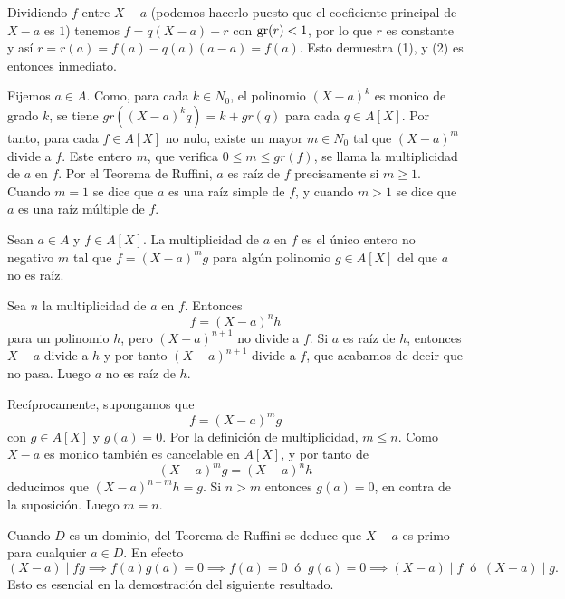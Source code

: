 \begin{proofbox}
Dividiendo $f$ entre $X-a$ (podemos hacerlo puesto que el coeficiente principal de $X-a$ es $1$) tenemos $f=q(X-a)+r$ con $\operatorname{gr}(r)<1$, por lo que $r$ es constante y así $r=r(a)=f(a)-q(a)(a-a)=f(a)$. Esto demuestra (1), y (2) es entonces inmediato.
\end{proofbox}

Fijemos $a \in A$. Como, para cada $k \in N_0$, el polinomio $(X - a)^k$ es monico de grado $k$, se tiene $gr((X - a)^k q) = k + gr(q)$ para cada $q \in A[X]$. Por tanto, para cada $f \in A[X]$ no nulo, existe un mayor $m \in N_0$ tal que $(X - a)^m$ divide a $f$. Este entero $m$, que verifica $0 \leq m \leq gr(f)$, se llama la multiplicidad de $a$ en $f$. Por el Teorema de Ruffini, $a$ es raíz de $f$ precisamente si $m \geq 1$. Cuando $m = 1$ se dice que $a$ es una raíz simple de $f$, y cuando $m > 1$ se dice que $a$ es una raíz múltiple de $f$.

\begin{lemma}{}{}
Sean $a \in A$ y $f \in A[X]$. La multiplicidad de $a$ en $f$ es el único entero no negativo $m$ tal que $f = (X - a)^m g$ para algún polinomio $g \in A[X]$ del que $a$ no es raíz.
\end{lemma}

\begin{proofbox}
Sea $n$ la multiplicidad de $a$ en $f$. Entonces
\[
f = (X - a)^n h
\]
para un polinomio $h$, pero $(X - a)^{n+1}$ no divide a $f$. Si $a$ es raíz de $h$, entonces $X - a$ divide a $h$ y por tanto $(X - a)^{n+1}$ divide a $f$, que acabamos de decir que no pasa. Luego $a$ no es raíz de $h$.

Recíprocamente, supongamos que
\[
f = (X - a)^m g
\]
con $g \in A[X]$ y $g(a) = 0$. Por la definición de multiplicidad, $m \leq n$. Como $X - a$ es monico también es cancelable en $A[X]$, y por tanto de
\[
(X - a)^m g = (X - a)^n h
\]
deducimos que $(X - a)^{n-m} h = g$. Si $n > m$ entonces $g(a) = 0$, en contra de la suposición. Luego $m = n$.
\end{proofbox}

Cuando $D$ es un dominio, del Teorema de Ruffini se deduce que $X - a$ es primo para cualquier $a \in D$. En efecto
\[
(X - a) \mid fg \implies f(a)g(a) = 0 \implies f(a) = 0 ~\text{ ó }~ g(a) = 0 \implies (X - a) \mid f ~\text{ ó }~ (X - a) \mid g.
\]
Esto es esencial en la demostración del siguiente resultado.

